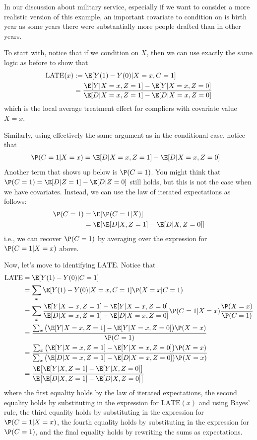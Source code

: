 \documentclass[
  letterpaper,
  DIV=11,
  numbers=noendperiod]{scrreprt}
\begin{document}
In our discussion about military service, especially if we want to
consider a more realistic version of this example, an important
covariate to condition on is birth year as some years there were
substantially more people drafted than in other years.

To start with, notice that if we condition on \(X\), then we can use
exactly the same logic as before to show that \begin{align*}
  \text{LATE}(x) &:= \E[Y(1) - Y(0) | X=x, C=1] \\
  &= \frac{\E[Y | X=x, Z=1] - \E[Y | X=x, Z=0]}{\E[D | X=x, Z=1] - \E[D | X=x, Z=0]}
\end{align*} which is the local average treatment effect for compliers
with covariate value \(X=x\).

Similarly, using effectively the same argument as in the conditional
case, notice that \begin{align*}
  \P(C=1 | X=x) &= \E[D| X=x, Z=1] - \E[D | X=x, Z=0]
\end{align*} Another term that shows up below is \(\P(C=1)\). You might
think that \(\P(C=1) = \E[D|Z=1] - \E[D|Z=0]\) still holds, but this is
not the case when we have covariates. Instead, we can use the law of
iterated expectations as follows: \begin{align*}
  \P(C=1) &= \E[\P(C=1 | X)] \\
  &= \E[\E[D| X, Z=1] - \E[D | X, Z=0]] \\
\end{align*} i.e., we can recover \(\P(C=1)\) by averaging over the
expression for \(\P(C=1 | X=x)\) above.

Now, let's move to identifying \(\text{LATE}\). Notice that
\begin{align*}
  \text{LATE} &= \E[Y(1) - Y(0) | C=1] \\
  &= \sum_x \E[Y(1) - Y(0) | X=x, C=1] \P(X=x | C=1) \\
  &= \sum_x \frac{\E[Y | X=x, Z=1] - \E[Y | X=x, Z=0]}{\E[D | X=x, Z=1] - \E[D | X=x, Z=0]} \P(C=1 | X=x) \frac{\P(X=x)}{\P(C=1)} \\
  &= \dfrac{\sum_x \big(\E[Y | X=x, Z=1] - \E[Y | X=x, Z=0]\big) \P(X=x)}{\P(C=1)} \\
  &= \dfrac{\sum_x \big(\E[Y | X=x, Z=1] - \E[Y | X=x, Z=0]\big) \P(X=x)}{\sum_x \big(\E[D | X=x, Z=1] - \E[D | X=x, Z=0]\big) \P(X=x)} \\
  &= \dfrac{\E\big[\E[Y | X, Z=1] - \E[Y | X, Z=0]\big]}{\E\big[\E[D | X, Z=1] - \E[D | X, Z=0]\big]}
\end{align*} where the first equality holds by the law of iterated
expectations, the second equality holds by substituting in the
expression for \(\text{LATE}(x)\) and using Bayes' rule, the third
equality holds by substituting in the expression for \(\P(C=1 | X=x)\),
the fourth equality holds by substituting in the expression for
\(\P(C=1)\), and the final equality holds by rewriting the sums as
expectations.
\end{document}
